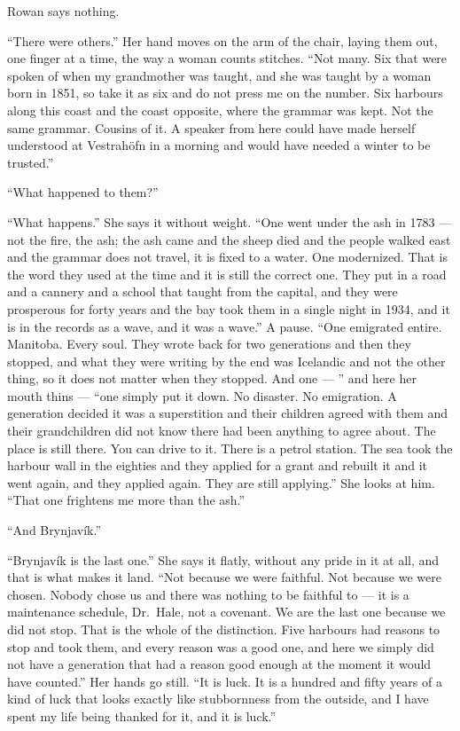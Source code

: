\documentclass[11pt,oneside]{book}
\begin{document}
Rowan says nothing.

``There were others.'' Her hand moves on the arm of the chair, laying
them out, one finger at a time, the way a woman counts stitches. ``Not
many. Six that were spoken of when my grandmother was taught, and she
was taught by a woman born in 1851, so take it as six and do not press
me on the number. Six harbours along this coast and the coast opposite,
where the grammar was kept. Not the same grammar. Cousins of it. A
speaker from here could have made herself understood at Vestrahöfn in a
morning and would have needed a winter to be trusted.''

``What happened to them?''

``What happens.'' She says it without weight. ``One went under the ash
in 1783 --- not the fire, the ash; the ash came and the sheep died and
the people walked east and the grammar does not travel, it is fixed to a
water. One modernized. That is the word they used at the time and it is
still the correct one. They put in a road and a cannery and a school
that taught from the capital, and they were prosperous for forty years
and the bay took them in a single night in 1934, and it is in the
records as a wave, and it was a wave.'' A pause. ``One emigrated
entire. Manitoba. Every soul. They wrote back for two generations and
then they stopped, and what they were writing by the end was Icelandic
and not the other thing, so it does not matter when they stopped. And
one --- '' and here her mouth thins --- ``one simply put it down. No
disaster. No emigration. A generation decided it was a superstition and
their children agreed with them and their grandchildren did not know
there had been anything to agree about. The place is still there. You can
drive to it. There is a petrol station. The sea took the harbour wall in
the eighties and they applied for a grant and rebuilt it and it went
again, and they applied again. They are still applying.'' She looks at
him. ``That one frightens me more than the ash.''

``And Brynjavík.''

``Brynjavík is the last one.'' She says it flatly, without any pride in
it at all, and that is what makes it land. ``Not because we were
faithful. Not because we were chosen. Nobody chose us and there was
nothing to be faithful to --- it is a maintenance schedule, Dr.~Hale,
not a covenant. We are the last one because we did not stop. That is the
whole of the distinction. Five harbours had reasons to stop and took
them, and every reason was a good one, and here we simply did not have a
generation that had a reason good enough at the moment it would have
counted.'' Her hands go still. ``It is luck. It is a hundred and fifty
years of a kind of luck that looks exactly like stubbornness from the
outside, and I have spent my life being thanked for it, and it is luck.''
\end{document}
